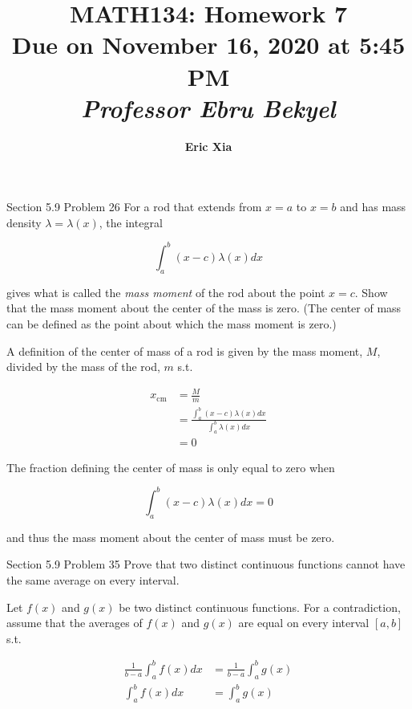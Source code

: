 \documentclass{article}
\title{
    \vspace{2in}
    \textmd{\textbf{MATH134: Homework 7}}\\
    \normalsize\vspace{0.1in}\small{Due on November 16, 2020 at 5:45 PM}\\
    \vspace{0.1in}\large{\textit{Professor Ebru Bekyel}}
    \vspace{3in}
}
\author{\textbf{Eric Xia}}
\date{}
\begin{document}
    \maketitle
    \pagebreak

    \thispagestyle{2}


    \begin{tbhtheorem}{Section 5.9 Problem 26}
        For a rod that extends from $x=a$ to $x=b$ and has mass density $\lambda = \lambda (x)$, the integral

        \[
            \int_a^b (x-c)\lambda (x)dx
        \]

        gives what is called the \textit{mass moment} of the rod about the point $x=c$. Show that the mass moment about the center of the mass is zero. (The center of mass can be defined as the point about which the mass
        moment is zero.)
    \end{tbhtheorem}

    A definition of the center of mass of a rod is given by the mass moment, $M$, divided by the mass of the rod, $m$ s.t.

    \begin{align*}
        x_{\text{cm}}   &= \frac{M}{m} \\
                        &= \frac{\int_a^b (x-c)\lambda(x)dx}{\int_a^b\lambda(x)dx} \\
                        &= 0
    \end{align*}

    The fraction defining the center of mass is only equal to zero when

    \[
        \int_a^b (x-c)\lambda(x)dx=0
    \]

    and thus the mass moment about the center of mass must be zero.




    \begin{tbhtheorem}{Section 5.9 Problem 35}
        Prove that two distinct continuous functions cannot have the same average on every interval.
    \end{tbhtheorem}

    Let $f(x)$ and $g(x)$ be two distinct continuous functions. For a contradiction, assume that the averages of $f(x)$ and $g(x)$ are equal on every interval $[a,b]$ s.t.

    \begin{align*}
        \frac{1}{b-a}\int_a^b f(x)dx    &= \frac{1}{b-a}\int_a^b g(x) \\
        \int_a^b f(x)dx                 &= \int_a^b g(x) \\
    \end{align*}
\end{document}
